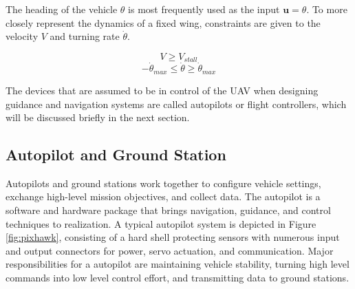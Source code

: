 \documentclass[numbered,pdftex]{ohio-etd}
\begin{document}
The heading of the vehicle $\theta$ is most frequently used as the input $\boldsymbol{u} = \theta$. To more closely represent the dynamics of a fixed wing, constraints are given to the velocity $V$ and turning rate $\dot{\theta}$. 



\begin{equation}\label{minVel}
V \geq V_{stall}
\end{equation}
\begin{equation}\label{headingRate}
-\dot{\theta}_{max} \leq \dot{\theta} \geq \dot{\theta}_{max}
\end{equation}

The devices that are assumed to be in control of the UAV when designing guidance and navigation systems are called autopilots or flight controllers, which will be discussed briefly in the next section. 


\subsection{Autopilot and Ground Station}



Autopilots and ground stations work together to configure vehicle settings, exchange high-level mission objectives, and collect data. The autopilot is a software and hardware package that brings navigation, guidance, and control techniques to realization. A typical autopilot system is depicted in Figure \ref{fig:pixhawk}, consisting of a hard shell protecting sensors with numerous input and output connectors for power, servo actuation, and communication. Major responsibilities for a autopilot are  maintaining vehicle stability, turning high level commands into low level control effort, and transmitting data to ground stations.



\end{document}
